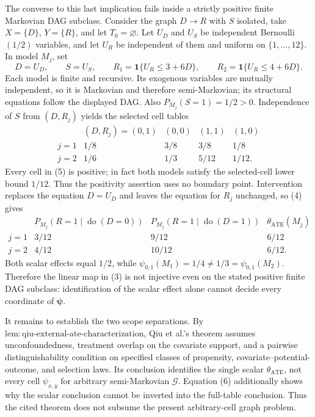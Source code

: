 The converse to this last implication fails inside a strictly positive finite Markovian DAG subclass. Consider the graph \(D\to R\) with \(S\) isolated, take \(X=\{D\}\), \(Y=\{R\}\), and let \(T_0=\varnothing\). Let \(U_D\) and \(U_S\) be independent Bernoulli\((1/2)\) variables, and let \(U_R\) be independent of them and uniform on \(\{1,\ldots,12\}\). In model \(M_j\), set
\[
D=U_D,\qquad S=U_S,
\qquad
R_1=\mathbf 1\{U_R\le 3+6D\},
\qquad
R_2=\mathbf 1\{U_R\le 4+6D\}.
\tag{4}
\]
Each model is finite and recursive. Its exogenous variables are mutually independent, so it is Markovian and therefore semi-Markovian; its structural equations follow the displayed DAG. Also \(P_{M_j}(S=1)=1/2>0\). Independence of \(S\) from \((D,R_j)\) yields the selected cell tables
\[
\begin{array}{c|cccc}
&(D,R_j)=(0,1)&(0,0)&(1,1)&(1,0)\\ \hline
j=1&1/8&3/8&3/8&1/8\\
j=2&1/6&1/3&5/12&1/12.
\end{array}
\tag{5}
\]
Every cell in (5) is positive; in fact both models satisfy the selected-cell lower bound \(1/12\). Thus the positivity assertion uses no boundary point. Intervention replaces the equation \(D=U_D\) and leaves the equation for \(R_j\) unchanged, so (4) gives
\[
\begin{array}{c|cc|c}
&P_{M_j}(R=1\mid\operatorname{do}(D=0))
&P_{M_j}(R=1\mid\operatorname{do}(D=1))
&\theta_{\mathrm{ATE}}(M_j)\\ \hline
j=1&3/12&9/12&6/12\\
j=2&4/12&10/12&6/12.
\end{array}
\tag{6}
\]
Both scalar effects equal \(1/2\), while \(\psi_{0,1}(M_1)=1/4\ne1/3=\psi_{0,1}(M_2)\). Therefore the linear map in (3) is not injective even on the stated positive finite DAG subclass: identification of the scalar effect alone cannot decide every coordinate of \(\boldsymbol\psi\).

It remains to establish the two scope separations. By \(\mathrm{lem{:}qiu\text{-}external\text{-}ate\text{-}characterization}\), Qiu et al.'s theorem assumes unconfoundedness, treatment overlap on the covariate support, and a pairwise distinguishability condition on specified classes of propensity, covariate--potential-outcome, and selection laws. Its conclusion identifies the single scalar \(\theta_{\mathrm{ATE}}\), not every cell \(\psi_{x,y}\) for arbitrary semi-Markovian \(\mathcal G\). Equation (6) additionally shows why the scalar conclusion cannot be inverted into the full-table conclusion. Thus the cited theorem does not subsume the present arbitrary-cell graph problem.

